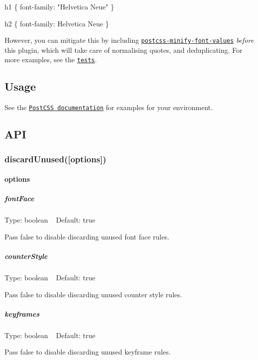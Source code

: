 \begin{DoxyCode}
h1 \{
    font-family: "Helvetica Neue"
\}

h2 \{
    font-family: Helvetica Neue
\}
\end{DoxyCode}


However, you can mitigate this by including \href{https://github.com/trysound/postcss-minify-font-values}{\tt postcss-\/minify-\/font-\/values} {\itshape before} this plugin, which will take care of normalising quotes, and deduplicating. For more examples, see the \href{test.js}{\tt tests}.

\subsection*{Usage}

See the \href{https://github.com/postcss/postcss#usage}{\tt Post\+C\+SS documentation} for examples for your environment.

\subsection*{A\+PI}

\subsubsection*{discard\+Unused(\mbox{[}options\mbox{]})}

\paragraph*{options}

\subparagraph*{font\+Face}

Type\+: {\ttfamily boolean} ~\newline
Default\+: {\ttfamily true}

Pass {\ttfamily false} to disable discarding unused font face rules.

\subparagraph*{counter\+Style}

Type\+: {\ttfamily boolean} ~\newline
Default\+: {\ttfamily true}

Pass {\ttfamily false} to disable discarding unused counter style rules.

\subparagraph*{keyframes}

Type\+: {\ttfamily boolean} ~\newline
Default\+: {\ttfamily true}

Pass {\ttfamily false} to disable discarding unused keyframe rules.

